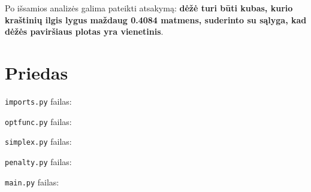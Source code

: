 \documentclass{article}
\begin{document}
Po išsamios analizės galima pateikti atsakymą: \textbf{dėžė turi būti kubas, kurio kraštinių ilgis lygus maždaug 0.4084 matmens, suderinto su sąlyga, kad dėžės paviršiaus plotas yra vienetinis}.
\section{Priedas}
\lstinline|imports.py| failas:

\lstinline|optfunc.py| failas:

\lstinline|simplex.py| failas:

\lstinline|penalty.py| failas:

\lstinline|main.py| failas:
\end{document}
